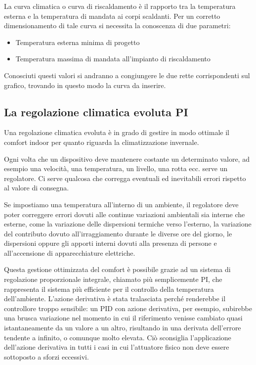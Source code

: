 \documentclass[laurea,oneside,11pt]{USiena_tesiLM}
\begin{document}
La curva climatica o curva di riscaldamento è il rapporto tra la temperatura esterna e la temperatura di mandata ai corpi scaldanti. Per un corretto dimensionamento di tale curva si necessita la conoscenza di due parametri:
\begin{itemize}
\item Temperatura esterna minima di progetto
\item Temperatura massima di mandata all'impianto di riscaldamento
\end{itemize}
Conosciuti questi valori si andranno a congiungere le due rette corrispondenti sul grafico, trovando in questo modo la curva da inserire.

\subsection{La regolazione climatica evoluta PI}
Una regolazione climatica evoluta è in grado di gestire in modo ottimale il comfort indoor per quanto riguarda la climatizzazione invernale.

Ogni volta che un dispositivo deve mantenere costante un determinato valore, ad esempio una velocità, una temperatura, un livello, una rotta ecc. serve un regolatore. Ci serve qualcosa che corregga eventuali ed inevitabili errori rispetto al valore di consegna.
 
Se impostiamo una temperatura all'interno di un ambiente, il regolatore deve poter correggere errori dovuti alle continue variazioni ambientali sia interne che esterne, come la variazione delle dispersioni termiche verso l'esterno, la variazione del contributo dovuto all'irraggiamento durante le diverse ore del giorno, le dispersioni oppure gli apporti interni dovuti alla presenza di persone e all'accensione di apparecchiature elettriche.

Questa gestione ottimizzata  del comfort è possibile grazie ad un sistema di regolazione proporzionale integrale, chiamato più semplicemente PI, che rappresenta il sistema più efficiente per il controllo della temperatura dell'ambiente. L'azione derivativa è stata tralasciata perché renderebbe il controllore troppo sensibile: un PID con azione derivativa, per esempio, subirebbe una brusca variazione nel momento in cui il riferimento venisse cambiato quasi istantaneamente da un valore a un altro, risultando in una derivata dell'errore tendente a infinito, o comunque molto elevata. Ciò sconsiglia l'applicazione dell'azione derivativa in tutti i casi in cui l'attuatore fisico non deve essere sottoposto a sforzi eccessivi.
\end{document}
